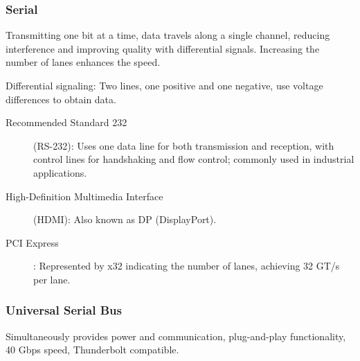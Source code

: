 \documentclass[11pt,journal,compsoc]{IEEEtran}
\begin{document}
\subsubsection{Serial}

Transmitting one bit at a time, data travels along a single channel, reducing interference and improving quality with differential signals. Increasing the number of lanes enhances the speed.

Differential signaling: Two lines, one positive and one negative, use voltage differences to obtain data.

\begin{description}
    \item[Recommended Standard 232] (RS-232): Uses one data line for both transmission and reception, with control lines for handshaking and flow control; commonly used in industrial applications.
    
    \item[High-Definition Multimedia Interface] (HDMI): Also known as DP (DisplayPort).
    
    \item[PCI Express]: Represented by x32 indicating the number of lanes, achieving 32 GT/s per lane.
\end{description}


\subsubsection{Universal Serial Bus}

Simultaneously provides power and communication, plug-and-play functionality, 40 Gbps speed, Thunderbolt compatible.
\end{document}
